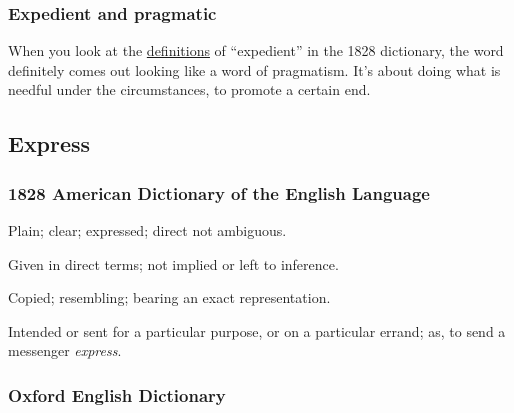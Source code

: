 		\subsubsection{Expedient and pragmatic}
			
			When you look at the \hyperref[EXPEDIENT-1828]{definitions} of ``expedient'' in the 1828 dictionary, the word definitely comes out looking like a word of pragmatism. It's about doing what is needful under the circumstances, to promote a certain end.
			
	\subsection{Express} %
		\label{EXPRESS}
		
		\subsubsection{1828 American Dictionary of the English Language}
		
			\begin{compactitem}
				\item Plain; clear; expressed; direct not ambiguous.
				\item[1] Given in direct terms; not implied or left to inference. 
				\item[2] Copied; resembling; bearing an exact representation.
				\item[3] Intended or sent for a particular purpose, or on a particular errand; as, to send a messenger \textit{express}.
			\end{compactitem}
			
		\subsubsection{Oxford English Dictionary}

